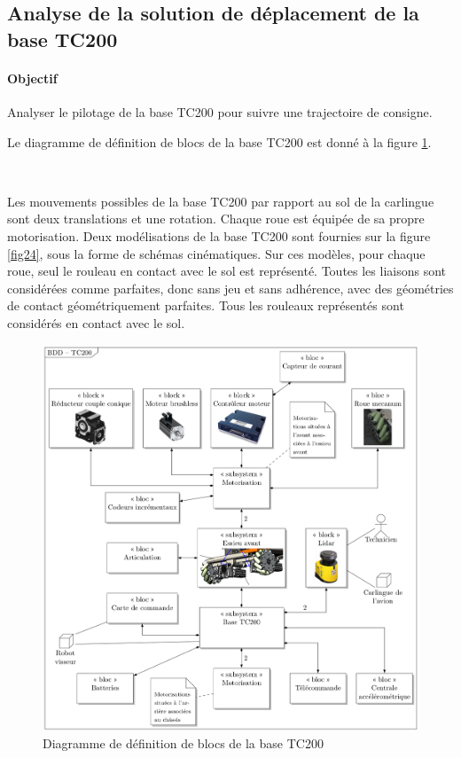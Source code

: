 \subsection{Analyse de la solution de déplacement de la base TC200}

\paragraph{Objectif} Analyser le pilotage de la base TC200 pour suivre une trajectoire de consigne.

Le diagramme de définition de blocs de la base TC200 est donné à la figure \ref{fig06}.


~\

Les mouvements possibles de la base TC200 par rapport au sol de la carlingue sont deux translations et une rotation. Chaque roue est équipée de sa propre motorisation. Deux modélisations de la base TC200 sont fournies sur la figure \ref{fig24}, sous la forme de schémas cinématiques. Sur ces modèles, pour chaque roue, seul le rouleau en contact avec le sol est représenté. Toutes les liaisons sont considérées comme parfaites, donc sans jeu et sans adhérence, avec des géométries de contact géométriquement parfaites. Tous les rouleaux représentés sont considérés en contact avec le sol.

\begin{figure}[!ht]
\begin{center}
 \includegraphics[width=0.9\linewidth]{img/fig06.png}
  \caption{Diagramme de définition de blocs de la base TC200}
\label{fig06}
 \end{center}
\end{figure}

